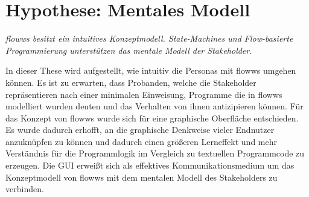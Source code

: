 \section{Hypothese: Mentales Modell}\label{sec:hypothese}
\textit{flowws besitzt ein intuitives Konzeptmodell. State-Machines und Flow-basierte Programmierung unterstützen das mentale Modell der Stakeholder.}

In dieser These wird aufgestellt, wie intuitiv die Personas mit flowws umgehen können. Es ist zu erwarten, dass Probanden, welche die Stakeholder repräsentieren nach einer minimalen Einweisung, Programme die in flowws modelliert wurden deuten und das Verhalten von ihnen antizipieren können. Für das Konzept von flowws wurde sich für eine graphische Oberfläche entschieden. Es wurde dadurch erhofft, an die graphische Denkweise vieler Endnutzer anzuknüpfen zu können und dadurch einen größeren Lerneffekt und mehr Verständnis für die Programmlogik im Vergleich zu textuellen Programmcode zu erzeugen. Die \ac{GUI} erweißt sich als effektives Kommunikationsmedium um das Konzeptmodell von flowws mit dem mentalen Modell des Stakeholders zu verbinden.